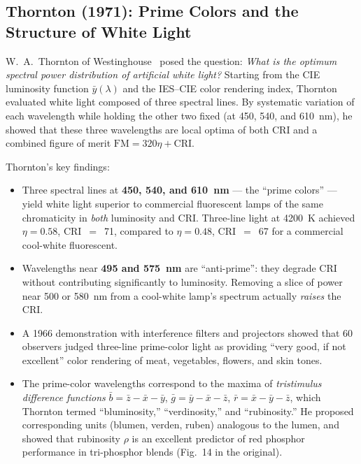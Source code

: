 \documentclass[11pt]{article}
\begin{document}
\subsection{Thornton (1971): Prime Colors and the Structure of White Light}

W.~A.~Thornton of Westinghouse~\cite{thornton1971} posed the question:
\emph{What is the optimum spectral power distribution of artificial white
light?}  Starting from the CIE luminosity function $\bar{y}(\lambda)$ and the
IES--CIE color rendering index, Thornton evaluated white light composed
of three spectral lines.  By systematic variation of each wavelength while
holding the other two fixed (at 450, 540, and 610~nm), he showed that
these three wavelengths are local optima of both CRI and a combined
figure of merit $\text{FM} = 320\eta + \text{CRI}$.

Thornton's key findings:
\begin{itemize}
\item Three spectral lines at \textbf{450, 540, and 610~nm} --- the
  ``prime colors'' --- yield white light superior to commercial
  fluorescent lamps of the same chromaticity in \emph{both} luminosity and
  CRI.  Three-line light at 4200~K achieved $\eta = 0.58$, CRI~$=$~71,
  compared to $\eta = 0.48$, CRI~$=$~67 for a commercial cool-white
  fluorescent.
\item Wavelengths near \textbf{495 and 575~nm} are ``anti-prime'':
  they degrade CRI without contributing significantly to luminosity.
  Removing a slice of power near 500 or 580~nm from a cool-white
  lamp's spectrum actually \emph{raises} the CRI.
\item A 1966 demonstration with interference filters and projectors showed
  that 60 observers judged three-line prime-color light as providing
  ``very good, if not excellent'' color rendering of meat, vegetables,
  flowers, and skin tones.
\item The prime-color wavelengths correspond to the maxima of
  \emph{tristimulus difference functions}
  $\bar{b} = \bar{z} - \bar{x} - \bar{y}$,
  $\bar{g} = \bar{y} - \bar{x} - \bar{z}$,
  $\bar{r} = \bar{x} - \bar{y} - \bar{z}$,
  which Thornton termed ``bluminosity,'' ``verdinosity,'' and ``rubinosity.''
  He proposed corresponding units (blumen, verden, ruben) analogous to the
  lumen, and showed that rubinosity $\rho$ is an excellent predictor of red
  phosphor performance in tri-phosphor blends (Fig.~14 in the original).
\end{itemize}
\end{document}
